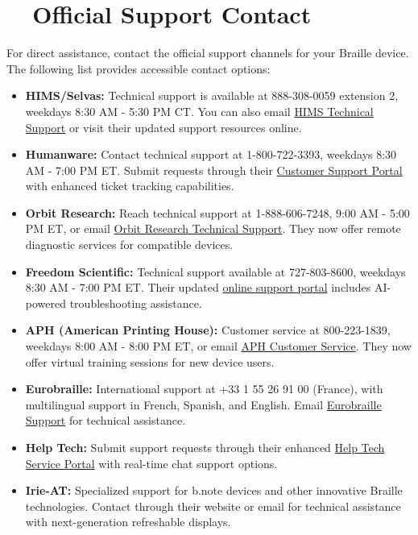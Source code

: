 \section{~~Official Support Contact}
\label{app2:report2}
For direct assistance, contact the official support channels for your Braille device. The following list provides accessible contact options:

\begin{itemize}
	\item \textbf{HIMS/Selvas:} Technical support is available at 888-308-0059 extension 2, weekdays 8:30 AM - 5:30 PM CT. You can also email \href{mailto:support@hims-inc.com}{HIMS Technical Support} or visit their updated support resources online.
	\item \textbf{Humanware:} Contact technical support at 1-800-722-3393, weekdays 8:30 AM - 7:00 PM ET. Submit requests through their \href{https://store.humanware.com/hus/contact/}{Customer Support Portal} with enhanced ticket tracking capabilities.
	\item \textbf{Orbit Research:} Reach technical support at 1-888-606-7248, 9:00 AM - 5:00 PM ET, or email \href{mailto:techsupport@orbitresearch.com}{Orbit Research Technical Support}. They now offer remote diagnostic services for compatible devices.
	\item \textbf{Freedom Scientific:} Technical support available at 727-803-8600, weekdays 8:30 AM - 7:00 PM ET. Their updated \href{https://support.freedomscientific.com/Forms/TechSupport}{online support portal} includes AI-powered troubleshooting assistance.
	\item \textbf{APH (American Printing House):} Customer service at 800-223-1839, weekdays 8:00 AM - 8:00 PM ET, or email \href{mailto:cs@aph.org}{APH Customer Service}. They now offer virtual training sessions for new device users.
	\item \textbf{Eurobraille:} International support at +33 1 55 26 91 00 (France), with multilingual support in French, Spanish, and English. Email \href{mailto:contact@eurobraille.fr}{Eurobraille Support} for technical assistance.
	\item \textbf{Help Tech:} Submit support requests through their enhanced \href{https://www.help-tech.com/contact}{Help Tech Service Portal} with real-time chat support options.
	\item \textbf{Irie-AT:} Specialized support for b.note devices and other innovative Braille technologies. Contact through their website or email for technical assistance with next-generation refreshable displays.
\end{itemize}

